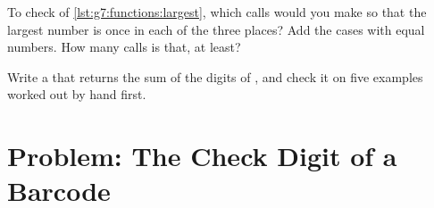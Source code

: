 \begin{exercise}[$\star\star\star$]\label{exo:g7:functions:11}
To check  of \cref{lst:g7:functions:largest}, which calls would
you make so that the largest number is once in each of the three places? Add
the cases with equal numbers. How many calls is that, at least?
\end{exercise}

\begin{exercise}[$\star\star\star$]\label{exo:g7:functions:12}
Write a   that returns the sum of the digits of
, and check it on five examples worked out by hand first.
\end{exercise}

\section{Problem: The Check Digit of a Barcode}

